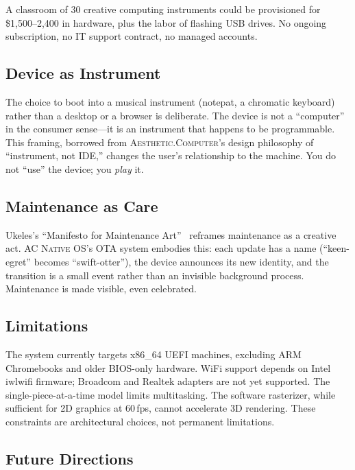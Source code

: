 \documentclass[10pt,letterpaper,twocolumn]{article}
\newcommand{\ac}{\textsc{Aesthetic.Computer}}
\newcommand{\acos}{\textsc{AC Native OS}}
\begin{document}
A classroom of 30 creative computing instruments could be provisioned for \$1{,}500--2{,}400 in hardware, plus the labor of flashing USB drives. No ongoing subscription, no IT support contract, no managed accounts.

\subsection{Device as Instrument}

The choice to boot into a musical instrument (notepat, a chromatic keyboard) rather than a desktop or a browser is deliberate. The device is not a ``computer'' in the consumer sense---it is an instrument that happens to be programmable. This framing, borrowed from \ac{}'s design philosophy of ``instrument, not IDE,'' changes the user's relationship to the machine. You do not ``use'' the device; you \emph{play} it.

\subsection{Maintenance as Care}

Ukeles's ``Manifesto for Maintenance Art''~\citep{ukeles1969manifesto} reframes maintenance as a creative act. \acos{}'s OTA system embodies this: each update has a name (``keen-egret'' becomes ``swift-otter''), the device announces its new identity, and the transition is a small event rather than an invisible background process. Maintenance is made visible, even celebrated.

\subsection{Limitations}

The system currently targets x86\_64 UEFI machines, excluding ARM Chromebooks and older BIOS-only hardware. WiFi support depends on Intel iwlwifi firmware; Broadcom and Realtek adapters are not yet supported. The single-piece-at-a-time model limits multitasking. The software rasterizer, while sufficient for 2D graphics at 60\,fps, cannot accelerate 3D rendering. These constraints are architectural choices, not permanent limitations.

\subsection{Future Directions}
\end{document}
